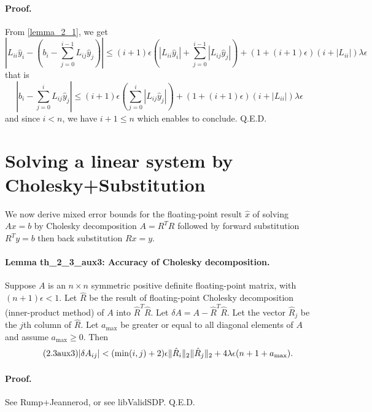 \documentclass[a4paper]{article}
\begin{document}
\paragraph*{Proof.}  From \ref{lemma_2_1}, we get
\begin{equation}
  \left|L_{ii}\hat{y}_i - \left(b_i - \sum_{j=0}^{i-1}L_{ij} \hat{y}_j\right)\right|
  \le (i+1)\epsilon \left(|L_{ii}\hat{y}_i| + \sum_{j=0}^{i-1}|L_{ij}\hat{y}_j|\right)
  + (1 + (i+1)\epsilon)(i + |L_{ii}|)\lambda \epsilon
\end{equation}
that is
\begin{equation}
  \left|b_i - \sum_{j=0}^{i}L_{ij} \hat{y}_j\right|
  \le (i+1)\epsilon \left(\sum_{j=0}^{i}|L_{ij}\hat{y}_j|\right)
  + (1 + (i+1)\epsilon)(i + |L_{ii}|)\lambda \epsilon
\end{equation}
and since $i < n$, we have $i + 1 \le n$ which enables to conclude. Q.E.D.

\section{Solving a linear system by Cholesky+Substitution}

We now derive mixed error bounds for the
floating-point result $\hat{x}$ of solving $Ax=b$ by Cholesky decomposition $A=R^T R$ followed by forward substitution $R^Ty=b$ then back substitution $Rx=y$.

\paragraph*{Lemma th\_2\_3\_aux3: Accuracy of Cholesky decomposition.}
Suppose $A$ is an $n\times n$ symmetric positive definite floating-point matrix,
with $(n+1)\epsilon < 1$.
Let $\hat{R}$ be the result of floating-point Cholesky decomposition (inner-product method)
of  $A$ into $\hat{R}^T \hat{R}$.
Let $\delta A = A - \hat{R}^T \hat{R}$.
Let the vector $\hat{R}_j$ be the $j$th column of $\hat{R}$.
Let $a_\mathrm{max}$ be greater or equal to all diagonal elements of $A$
and assume $a_\mathrm{max} \geq 0$.
Then
\begin{equation}\tag{2.3aux3}
  |\delta A _{ij}| < (\mathrm{min}(i,j)+2)\epsilon \lVert \hat{R}_i \rVert_2 \lVert \hat{R}_j \rVert_2
  + 4 \lambda\epsilon (n+1+a_\mathrm{max}).
\end{equation}

\paragraph*{Proof.} See Rump+Jeannerod, or see libValidSDP.  Q.E.D.
\end{document}
